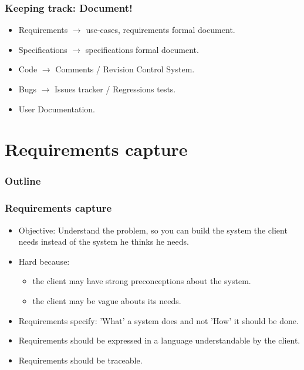 \documentclass[10pt]{beamer}
\begin{document}
\begin{frame}[fragile]
  \frametitle{Keeping track: Document!}
  \begin{itemize}
  \item Requirements $\longrightarrow$ use-cases, requirements formal document.
  \item Specifications $\longrightarrow$ specifications formal document.
  \item Code $\longrightarrow$ Comments / Revision Control System.
  \item Bugs $\longrightarrow$ Issues tracker / Regressions tests.
  \item User Documentation.
  \end{itemize}
\end{frame}

\section{Requirements capture}

\begin{frame}
  \frametitle{Outline}
  \tableofcontents[currentsection]
\end{frame}

\begin{frame}[fragile]
  \frametitle{Requirements capture}
  \begin{itemize}
  \item Objective: Understand the problem,
    so you can build the system the client needs instead of the system he
    thinks he needs.
  \item Hard because:
    \begin{itemize}
    \item the client may have strong preconceptions about the system.
    \item the client may be vague abouts its needs.
    \end{itemize}
  \item Requirements specify: 'What' a system does and not 'How' it should be
      done.
  \item Requirements should be expressed in a language understandable by the
    client.
  \item Requirements should be traceable.
  \end{itemize}
\end{frame}
\end{document}
